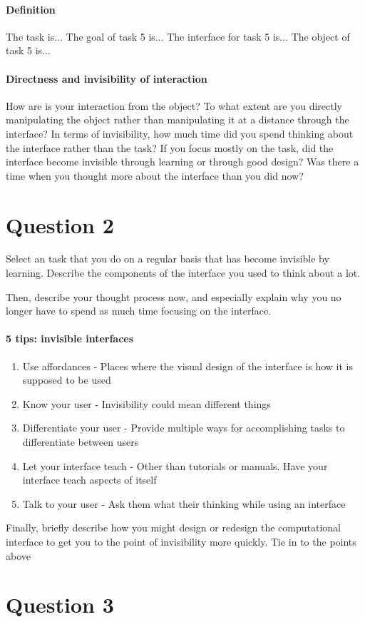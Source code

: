\paragraph{Definition}
The task is... The goal of task 5 is... The interface for task 5 is... The object of task 5 is...

\paragraph{Directness and invisibility of interaction}
How are is your interaction from the object? To what extent are you directly manipulating the object rather than manipulating it at a distance through the interface? In terms of invisibility, how much time did you spend thinking about the interface rather than the task? If you focus mostly on the task, did the interface become invisible through learning or through good design? Was there a time when you thought more about the interface than you did now?

\section{Question 2}

Select an task that you do on a regular basis that has become invisible by learning. Describe the components of the interface you used to think about a lot.

Then, describe your thought process now, and especially explain why you no longer have to spend as much time focusing on the interface.

\paragraph{5 tips: invisible interfaces}
\begin{enumerate}
\item
  Use affordances - Places where the visual design of the interface is how it is supposed to be used
\item
  Know your user - Invisibility could mean different things
\item
  Differentiate your user - Provide multiple ways for accomplishing tasks to differentiate between users
\item
  Let your interface teach - Other than tutorials or manuals. Have your interface teach aspects of itself
\item
  Talk to your user - Ask them what their thinking while using an interface
\end{enumerate}

Finally, briefly describe how you might design or redesign the computational interface to get you to the point of invisibility more quickly. Tie in to the points above

\section{Question 3}



